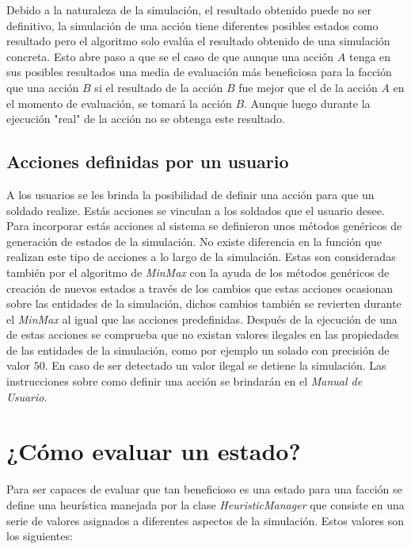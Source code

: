 \documentclass[twoside]{article}
\begin{document}
Debido a la naturaleza de la simulaci\'on, el resultado obtenido puede no ser definitivo, la simulaci\'on de una acci\'on tiene diferentes posibles estados como resultado pero el algoritmo solo eval\'ua el resultado obtenido de una simulaci\'on
concreta. Esto abre paso a que se el caso de que aunque una acci\'on $A$ tenga en sus posibles resultados una media de evaluaci\'on m\'as beneficiosa para la facci\'on que una acci\'on $B$ si el resultado de la acci\'on $B$ fue mejor que el de la acci\'on $A$ en el momento de evaluaci\'on, se tomar\'a la acci\'on $B$. Aunque luego durante la ejecuci\'on "real" de la acci\'on no se obtenga este resultado.


\subsection{Acciones definidas por un usuario}

A los usuarios se les brinda la posibilidad de definir una acci\'on para que un soldado realize. Est\'as acciones se vinculan a los soldados que el usuario desee. Para incorporar est\'as acciones al sistema se definieron unos m\'etodos gen\'ericos de generaci\'on de estados de la simulaci\'on. No existe diferencia en la funci\'on que realizan este tipo de acciones a lo largo de la simulaci\'on. Estas son consideradas tambi\'en por el algoritmo de \emph{MinMax} con la ayuda de los m\'etodos genéricos de creaci\'on de nuevos estados a trav\'es de los cambios que estas acciones ocasionan sobre las entidades de la simulaci\'on, dichos cambios tambi\'en se revierten durante el \emph{MinMax} al igual que las acciones predefinidas. Despu\'es de la ejecuci\'on de una de estas acciones se comprueba que no existan valores ilegales en las propiedades de las entidades de la simulaci\'on, como por ejemplo un solado con precisi\'on de valor $50$. En caso de ser detectado un valor ilegal se detiene la simulaci\'on. Las instrucciones sobre como definir una acci\'on se brindar\'an en el \emph{Manual de Usuario}.

\section{¿C\'omo evaluar un estado?}

Para ser capaces de evaluar que tan beneficioso es una estado para una facci\'on se define una heur\'istica manejada por la clase \emph{HeuristicManager} que consiste en una serie de valores asignados a diferentes aspectos de la simulaci\'on. Estos valores son los siguientes:
\end{document}
